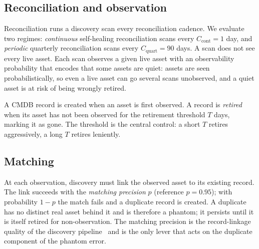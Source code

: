 \documentclass[journal]{IEEEtran}
\begin{document}
\subsection{Reconciliation and observation}
Reconciliation runs a discovery scan every reconciliation cadence. We evaluate two regimes:
\emph{continuous} self-healing reconciliation scans every $C_{\text{cont}} = 1$ day, and
\emph{periodic} quarterly reconciliation scans every $C_{\text{quart}} = 90$ days. A scan does not
see every live asset. Each scan observes a given live asset with an observability probability that
encodes that some assets are quiet: assets are seen probabilistically, so even a live asset can go
several scans unobserved, and a quiet asset is at risk of being wrongly retired.

A CMDB record is created when an asset is first observed. A record is \emph{retired} when its asset
has not been observed for the retirement threshold $T$ days, marking it as gone. The threshold is the
central control: a short $T$ retires aggressively, a long $T$ retires leniently.

\subsection{Matching}
At each observation, discovery must link the observed asset to its existing record. The link succeeds
with the \emph{matching precision} $p$ (reference $p = 0.95$); with probability $1 - p$ the match
fails and a duplicate record is created. A duplicate has no distinct real asset behind it and is
therefore a phantom; it persists until it is itself retired for non-observation. The matching
precision is the record-linkage quality of the discovery pipeline~\cite{fellegi1969linkage,christen2012matching}
and is the only lever that acts on the duplicate component of the phantom error.
\end{document}
